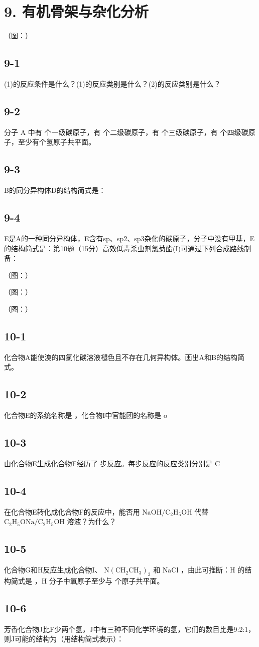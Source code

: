 \section*{9. 有机骨架与杂化分析}
（图：）

\subsection*{9-1}
(1)的反应条件是什么？(1)的反应类别是什么？(2)的反应类别是什么？

\subsection*{9-2}
分⼦ A 中有 个⼀级碳原⼦，有 个⼆级碳原⼦，有 个三级碳原⼦，有 个四级碳原⼦，⾄少有个氢原⼦共平⾯。

\subsection*{9-3}
B的同分异构体D的结构简式是：

\subsection*{9-4}
E是A的⼀种同分异构体，E含有sp、sp2、sp3杂化的碳原⼦，分⼦中没有甲基，E的结构简式是：第10题（15分）⾼效低毒杀⾍剂氯菊酯(I)可通过下列合成路线制备：

（图：）

（图：）

（图：）

\subsection*{10-1}
化合物A能使溴的四氯化碳溶液褪⾊且不存在⼏何异构体。画出A和B的结构简式。

\subsection*{10-2}
化合物E的系统名称是 ，化合物I中官能团的名称是 o

\subsection*{10-3}
由化合物E⽣成化合物F经历了 步反应。每步反应的反应类别分别是 C

\subsection*{10-4}
在化合物E转化成化合物F的反应中，能否⽤ $\mathrm { N a O H / C _ { 2 } H _ { 5 } O H }$ 代替 $\mathrm { C _ { 2 } H _ { 5 } O N a / C _ { 2 } H _ { 5 } O H }$ 溶液？为什么？

\subsection*{10-5}
化合物G和H反应⽣成化合物I、 $\mathrm { { N } ( C H _ { 2 } C H _ { 3 } ) _ { 3 } }$ 和 $\mathrm { N a C l }$ ，由此可推断：H 的结构简式是 ，H 分⼦中氧原⼦⾄少与 个原⼦共平⾯。

\subsection*{10-6}
芳⾹化合物J⽐F少两个氢，J中有三种不同化学环境的氢，它们的数⽬⽐是9:2:1，则J可能的结构为（⽤结构简式表⽰）：
